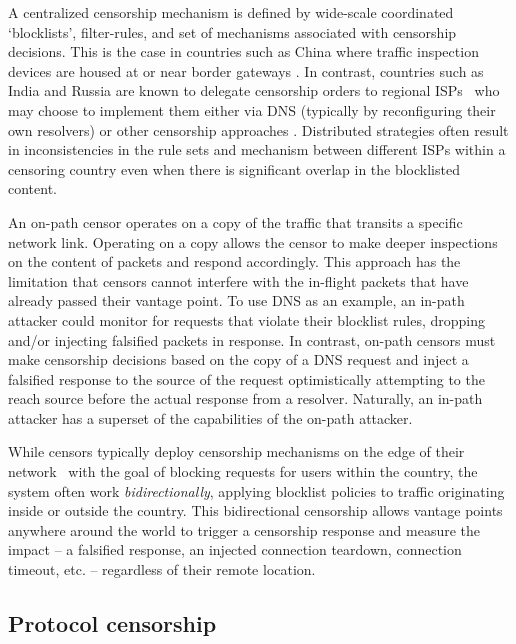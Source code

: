 A centralized censorship mechanism is defined by wide-scale coordinated
`blocklists', filter-rules, and set of mechanisms associated with censorship
decisions. This is the case in countries such as China where traffic inspection
devices are housed at or near border gateways \cite{xu2011internet}. In
contrast, countries such as India and Russia are known to delegate censorship
orders to regional ISPs~\cite{Gosain2017a} who may choose to implement them
either via DNS (typically by reconfiguring their own resolvers) or other
censorship approaches \cite{ramesh2020decentralized, Yadav2018a,
singh2020india}. Distributed strategies often result in inconsistencies in the
rule sets and mechanism between different ISPs within a censoring
country even when there is significant overlap in the blocklisted content.

An on-path censor operates on a copy of the traffic that transits a specific
network link. Operating on a copy allows the censor to make deeper inspections
on the content of packets and respond accordingly. This approach has the
limitation that censors cannot interfere with the in-flight packets that have
already passed their vantage point. To use DNS as an example, an in-path
attacker could monitor for requests that violate their blocklist rules, dropping
and/or injecting falsified packets in response. In contrast, on-path
censors must make censorship decisions based on the copy of a DNS request and
inject a falsified response to the source of the request optimistically
attempting to the reach source before the actual response from a resolver.
%
Naturally, an in-path attacker has a superset of the capabilities of the
on-path attacker.

While censors typically deploy censorship mechanisms on the edge of their
network~\cite{xu2011internet} with the goal of blocking requests for users
within the country, the system often work \emph{bidirectionally}, applying
blocklist policies to traffic originating inside or outside the country.
This bidirectional censorship allows vantage points anywhere around the world
to trigger a censorship response and measure the impact --  a falsified
response, an injected connection teardown, connection timeout, etc. --
regardless of their remote location.

\subsection{Protocol censorship}\label{sec:background:proto}

